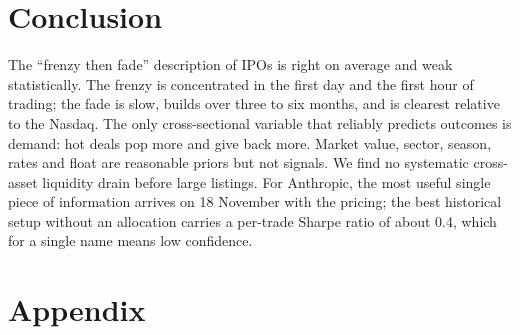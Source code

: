 \documentclass[11pt]{article}
\begin{document}
\section{Conclusion}

The ``frenzy then fade'' description of IPOs is right on average and weak statistically. The frenzy is concentrated in the first day and the first hour of trading; the fade is slow, builds over three to six months, and is clearest relative to the Nasdaq. The only cross-sectional variable that reliably predicts outcomes is demand: hot deals pop more and give back more. Market value, sector, season, rates and float are reasonable priors but not signals. We find no systematic cross-asset liquidity drain before large listings. For Anthropic, the most useful single piece of information arrives on 18 November with the pricing; the best historical setup without an allocation carries a per-trade Sharpe ratio of about 0.4, which for a single name means low confidence.

\vspace{1em}




\clearpage
\appendix
\section{Appendix}


\end{document}
